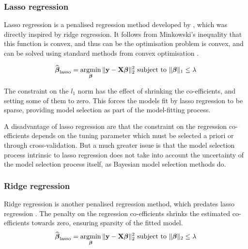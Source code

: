 \subsubsection{Lasso regression}
Lasso regression is a penalised regression method developed by \citep{Tibshirani1996}, which was directly
inspired by ridge regression.
It follows from Minkowski's inequality that this function is convex, and thus can be the optimisation problem
is convex, and can be solved using standard methods from convex optimisation \citep{Boyd2010}.

$$
\widehat{\vbeta}_{\text{lasso}} = \argmin_\vbeta \|\vy - \mX \vbeta\|_2^2 \text{ subject to } \|\vbeta\|_1 \leq \lambda
$$

The constraint on the $l_1$ norm has the effect of shrinking the co-efficients, and setting some of them to
zero. This forces the models fit by lasso regression to be sparse, providing model selection as part of the
model-fitting process.

A disadvantage of lasso regression are that the constraint on the regression co-efficients depends on the
tuning parameter which must be selected a priori or through cross-validation. But a much greater issue is that
the model selection process intrinsic to lasso regression does not take into account the uncertainty of the
model selection process itself, as Bayesian model selection methods do.

\subsubsection{Ridge regression}
Ridge regression is another penalised regression method, which predates lasso regression
\cite{Hoerl1970}. The penalty on the regression co-efficients shrinks the estimated co-efficients towards
zero, ensuring sparsity of the fitted model.
$$
\widehat{\vbeta}_{\text{lasso}} = \argmin_\vbeta \|\vy - \mX \vbeta\|_2^2 \text{ subject to } \|\vbeta\|_2 \leq \lambda
$$

